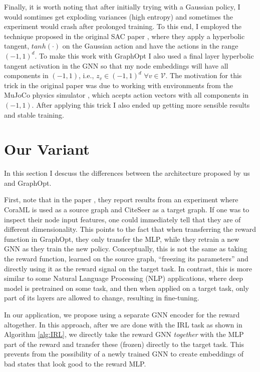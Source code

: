\documentclass{report}
\numberwithin{equation}{section}
\numberwithin{figure}{section}
\numberwithin{table}{section}
\numberwithin{algorithm}{section}
\begin{document}
Finally, it is worth noting that after initially trying with a 
Gaussian policy, I would somtimes get exploding variances (high 
entropy) and sometimes the experiment would crash after prolonged 
training. To this end, I employed the technique proposed 
in the original SAC paper \citep{SAC2}, where they apply a 
hyperbolic tangent, $tanh(\cdot)$ on the Gaussian action and 
have the actions in the range $(-1, 1)^{d}$. To make this work 
with GraphOpt I also used a final layer hyperbolic tangent 
activation in the GNN so that my node embeddings will have 
all components in $(-1, 1)$, i.e., $z_v\in (-1, 1)^{d}$ 
$\forall v\in\mathcal{V}$. The motivation for this trick in the 
original paper was due to working with environments 
from the MuJoCo physics simulator 
\citep{MuJoCo}, which acepts action vectors with all components 
in $(-1, 1)$. After applying this trick I also ended up getting 
more sensible results and stable training.

\section{Our Variant}
In this section I descuss the differences between the architecture 
proposed by us and GraphOpt.

First, note that in the paper \cite{GraphOpt}, they report 
results from an experiment where 
CoraML \citep{Cora} is used as a source graph 
and CiteSeer \citep{CiteSeer} as a target graph. If 
one was to inspect their node input features, one could 
immediately tell that they are of different dimensionality.
This points to the fact that when transferring the reward 
function in GraphOpt, they only transfer the MLP, while they 
retrain a new GNN as they train the new policy. Conceptually, 
this is not the same as taking the reward function, learned on 
the source graph, ``freezing its parameters'' and directly 
using it as the reward signal on the target task. In contrast,
this is more similar to some Natural Language Processing (NLP) 
applications, where deep model is pretrained on some task, and 
then when applied on a target task, only part of its layers are 
allowed to change, resulting in fine-tuning.

In our application, we propose using a separate GNN encoder for 
the reward altogether. In this approach, after we are done with 
the IRL task as shown in Algorithm \ref{alg:IRL}, we directly 
take the reward GNN \textit{together} with the MLP part of the 
reward and transfer these (frozen) directly to the target task. 
This prevents from the possibility of a newly trained 
GNN to create embeddings of bad states that look good to the 
reward MLP.
\end{document}
